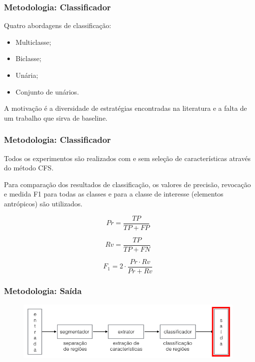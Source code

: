 \documentclass[t]{beamer}
\begin{document}
\begin{frame}[c]
	\frametitle{Metodologia: Classificador}
	
	Quatro abordagens de classificação:
	\begin{itemize}
		\item Multiclasse;
		\item Biclasse;
		\item Unária;
		\item Conjunto de unários.
	\end{itemize}

	\vspace{0.5cm}

	A motivação é a diversidade de estratégias encontradas na literatura e a falta de um trabalho que sirva de baseline.
\end{frame}

\begin{frame}[c]
	\frametitle{Metodologia: Classificador}

	Todos os experimentos são realizados com e sem seleção de características através do método CFS.

	\vspace{0.5cm}

	Para comparação dos resultados de classificação, os valores de precisão, revocação e medida F1 para todas as classes e para a classe de interesse (elementos antrópicos) são utilizados.

	\begin{equation*}
		\displaystyle Pr = \frac{TP}{TP+FP}
	\end{equation*}

	\begin{equation*}
		\displaystyle Rv = \frac{TP}{TP+FN}
	\end{equation*}

	\begin{equation*}
  		\displaystyle F_1 = 2 \cdot \frac{Pr \cdot Rv}{Pr + Rv}
	\end{equation*}
\end{frame}

\begin{frame}[c]
	\frametitle{Metodologia: Saída}
	\begin{figure}[h]
    	\includegraphics[width=\textwidth]{imgs/arquitetura_5}
	\end{figure}
\end{frame}
\end{document}
